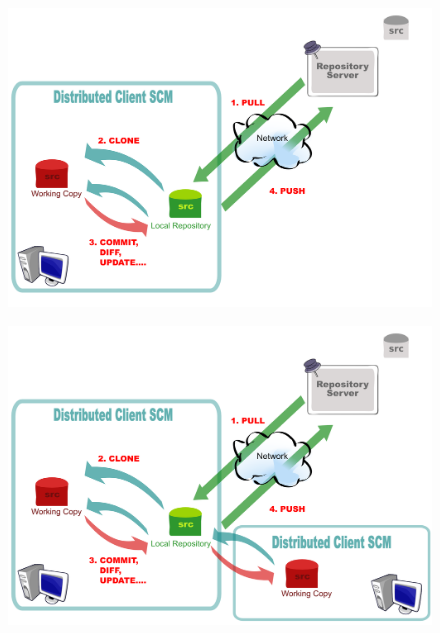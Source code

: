 \documentclass[handout]{beamer}
\begin{document}
\begin{frame}
	\begin{figure}[lt]
		\includegraphics[scale=0.35]{../img/distributed-scm-simple.png}
	\end{figure}
\end{frame}

\begin{frame}
	\begin{figure}[lt]
		\includegraphics[scale=0.35]{../img/distributed-scm-full.png}
	\end{figure}
\end{frame}
\end{document}
